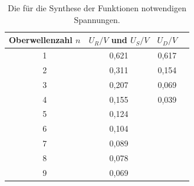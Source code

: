 \begin{table}[H]
  \centering
  \caption{Die für die Synthese der Funktionen notwendigen Spannungen.}
  \label{tab:Rechteckspannung}
  \begin{tabular}{c | c | c c}
    \toprule
    Oberwellenzahl $n$ & $U_R/V$ und $U_S/V$ & $U_D/V$   \\
    \midrule
    1 & 0,621 & 0,617\\
    2 & 0,311 & 0,154\\
    3 & 0,207 & 0,069\\
    4 & 0,155 & 0,039\\
    5 & 0,124\\
    6 & 0,104\\
    7 & 0,089\\
    8 & 0,078\\
    9 & 0,069\\
    \bottomrule
  \end{tabular}
\end{table}
